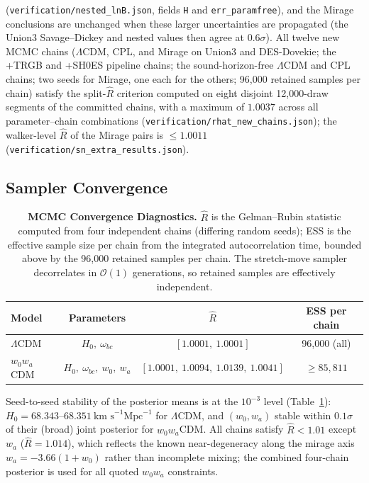 \documentclass[aps,prd,preprint,superscriptaddress,nofootinbib]{revtex4-2}
\begin{document}
(\texttt{verification/nested\_lnB.json}, fields \texttt{H} and \texttt{err\_paramfree}), and the Mirage conclusions are unchanged when these larger uncertainties are propagated (the Union3 Savage--Dickey and nested values then agree at $0.6\sigma$). All twelve new MCMC chains ($\Lambda$CDM, CPL, and Mirage on Union3 and DES-Dovekie; the +TRGB and +SH0ES pipeline chains; the sound-horizon-free $\Lambda$CDM and CPL chains; two seeds for Mirage, one each for the others; 96{,}000 retained samples per chain) satisfy the split-$\widehat{R}$ criterion computed on eight disjoint 12{,}000-draw segments of the committed chains, with a maximum of $1.0037$ across all parameter--chain combinations (\texttt{verification/rhat\_new\_chains.json}); the walker-level $\widehat{R}$ of the Mirage pairs is $\le 1.0011$ (\texttt{verification/sn\_extra\_results.json}).

\subsection{Sampler Convergence}

\begin{table}[!htbp]
    \centering
    \caption{\textbf{MCMC Convergence Diagnostics.} $\widehat{R}$ is the Gelman--Rubin statistic computed from four independent chains (differing random seeds); ESS is the effective sample size per chain from the integrated autocorrelation time, bounded above by the 96{,}000 retained samples per chain. The stretch-move sampler decorrelates in $\mathcal{O}(1)$ generations, so retained samples are effectively independent.}
    \label{m:tab:convergence}
    \begin{tabular}{lccc}
        \toprule
        Model & Parameters & $\widehat{R}$ & ESS per chain \\
        \midrule
        $\Lambda$CDM & $H_0,\ \omega_{bc}$ & $[1.0001,\ 1.0001]$ & 96{,}000 (all) \\
        $w_0 w_a$CDM & $H_0,\ \omega_{bc},\ w_0,\ w_a$ & $[1.0001,\ 1.0094,\ 1.0139,\ 1.0041]$ & $\ge 85{,}811$ \\
        \bottomrule
    \end{tabular}
\end{table}

Seed-to-seed stability of the posterior means is at the $10^{-3}$ level (Table~\ref{m:tab:convergence}): $H_0 = 68.343$--$68.351~\text{km~s}^{-1}\text{Mpc}^{-1}$ for $\Lambda$CDM, and $(w_0, w_a)$ stable within $0.1\sigma$ of their (broad) joint posterior for $w_0 w_a$CDM. All chains satisfy $\widehat{R} < 1.01$ except $w_a$ ($\widehat{R} = 1.014$), which reflects the known near-degeneracy along the mirage axis $w_a = -3.66(1+w_0)$ rather than incomplete mixing; the combined four-chain posterior is used for all quoted $w_0 w_a$ constraints.
\end{document}
